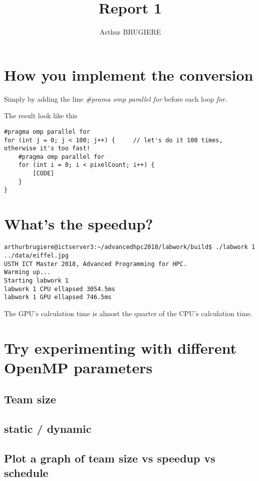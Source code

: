 \documentclass[11pt]{article} %
\title{Report 1}
\author{Arthur BRUGIERE}
\begin{document}
\maketitle

\section{How you implement the conversion}

Simply by adding the line {\it \#prama omp parallel for} before each loop {\it for}.

The result look like this

\lstset{language=C++}
\begin{lstlisting}
#pragma omp parallel for
for (int j = 0; j < 100; j++) {     // let's do it 100 times, otherwise it's too fast!
    #pragma omp parallel for
    for (int i = 0; i < pixelCount; i++) {
        [CODE]
    }
}
\end{lstlisting}

\section{What’s the speedup?}

\lstset{language=Bash}
\begin{lstlisting}
arthurbrugiere@ictserver3:~/advancedhpc2018/labwork/build$ ./labwork 1 ../data/eiffel.jpg 
USTH ICT Master 2018, Advanced Programming for HPC.
Warming up...
Starting labwork 1
labwork 1 CPU ellapsed 3054.5ms
labwork 1 GPU ellapsed 746.5ms
\end{lstlisting}

The GPU's calculation time is almost the quarter of the CPU's calculation time.

\section{Try experimenting with different OpenMP parameters}

\subsection{Team size}

\subsection{static / dynamic}

\subsection{Plot a graph of team size vs speedup vs schedule}
\end{document}
